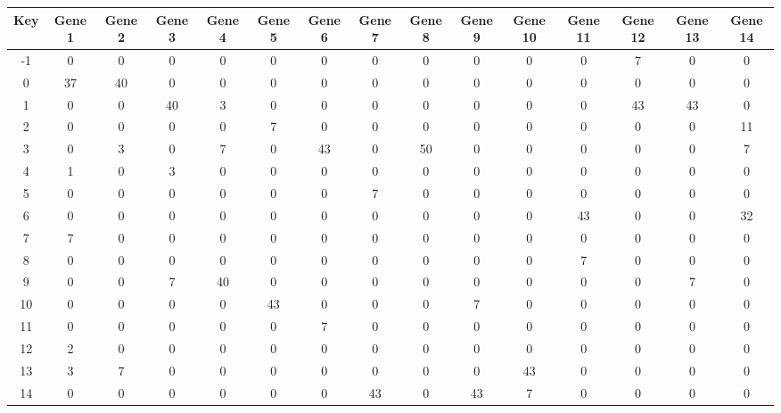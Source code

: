 \begin{tabular}{|c|c|c|c|c|c|c|c|c|c|c|c|c|c|c|}
\hline
Key & Gene 1 & Gene 2 & Gene 3 & Gene 4 & Gene 5 & Gene 6 & Gene 7 & Gene 8 & Gene 9 & Gene 10 & Gene 11 & Gene 12 & Gene 13 & Gene 14 \\
\hline
-1 & 0 & 0 & 0 & 0 & 0 & 0 & 0 & 0 & 0 & 0 & 0 & 7 & 0 & 0 \\
0 & 37 & 40 & 0 & 0 & 0 & 0 & 0 & 0 & 0 & 0 & 0 & 0 & 0 & 0 \\
1 & 0 & 0 & 40 & 3 & 0 & 0 & 0 & 0 & 0 & 0 & 0 & 43 & 43 & 0 \\
2 & 0 & 0 & 0 & 0 & 7 & 0 & 0 & 0 & 0 & 0 & 0 & 0 & 0 & 11 \\
3 & 0 & 3 & 0 & 7 & 0 & 43 & 0 & 50 & 0 & 0 & 0 & 0 & 0 & 7 \\
4 & 1 & 0 & 3 & 0 & 0 & 0 & 0 & 0 & 0 & 0 & 0 & 0 & 0 & 0 \\
5 & 0 & 0 & 0 & 0 & 0 & 0 & 7 & 0 & 0 & 0 & 0 & 0 & 0 & 0 \\
6 & 0 & 0 & 0 & 0 & 0 & 0 & 0 & 0 & 0 & 0 & 43 & 0 & 0 & 32 \\
7 & 7 & 0 & 0 & 0 & 0 & 0 & 0 & 0 & 0 & 0 & 0 & 0 & 0 & 0 \\
8 & 0 & 0 & 0 & 0 & 0 & 0 & 0 & 0 & 0 & 0 & 7 & 0 & 0 & 0 \\
9 & 0 & 0 & 7 & 40 & 0 & 0 & 0 & 0 & 0 & 0 & 0 & 0 & 7 & 0 \\
10 & 0 & 0 & 0 & 0 & 43 & 0 & 0 & 0 & 7 & 0 & 0 & 0 & 0 & 0 \\
11 & 0 & 0 & 0 & 0 & 0 & 7 & 0 & 0 & 0 & 0 & 0 & 0 & 0 & 0 \\
12 & 2 & 0 & 0 & 0 & 0 & 0 & 0 & 0 & 0 & 0 & 0 & 0 & 0 & 0 \\
13 & 3 & 7 & 0 & 0 & 0 & 0 & 0 & 0 & 0 & 43 & 0 & 0 & 0 & 0 \\
14 & 0 & 0 & 0 & 0 & 0 & 0 & 43 & 0 & 43 & 7 & 0 & 0 & 0 & 0 \\
\hline
\end{tabular}